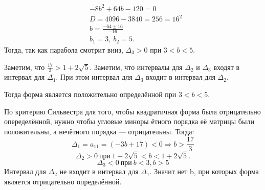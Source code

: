 	\begin{align*}
	&-8b^2 + 64b - 120 = 0 \\
	&D = 4096 - 3840 = 256 = 16^2 \\ 
	&b = \frac{-64 \pm 16}{-16} \\
	&b_1 = 3,\ b_2 = 5.
	\end{align*}
	Тогда, так как парабола смотрит вниз, $\Delta_3 > 0$ при $3 < b < 5$.
	
	Заметим, что $\frac{17}{3} > 1 + 2\sqrt{5}$. 
	Заметим, что интервалы для $\Delta_2$ и $\Delta_3$ входят в интервал для $\Delta_1$. При этом интервал для $\Delta_3$ входит в интервал для $\Delta_2$.
	
	Тогда форма является положительно определённой при $3 < b < 5$.

	По критерию Сильвестра для того, чтобы квадратичная форма была отрицательно опеределённой, нужно чтобы угловые миноры ётного порядка её матрицы были положительны, а нечётного порядка — отрицательны. Тогда:
	\[
		\Delta_1 = a_{11} = (-3b + 17) < 0 \Rightarrow b > \frac{17}{3}
	\]	
	\[
		\Delta_2 > 0\ при\ 1 - 2\sqrt{5} < b < 1 + 2\sqrt{5}.
	\]	
	\[
		\Delta_3 < 0\ при\ b < 3, b > 5
	\]
	Интервал для $\Delta_2$ не входит в интервал для $\Delta_1$.
	Значит нет b, при которых форма является отрицательно определённой.

	